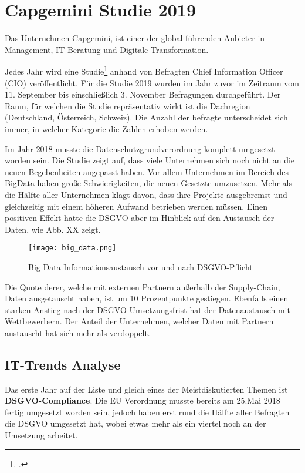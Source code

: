 \section{Capgemini Studie 2019}
Das Unternehmen Capgemini, ist einer der global führenden Anbieter in Management, IT-Beratung und Digitale Transformation.

Jedes Jahr wird eine Studie\footcite{Capgemini-Studie} anhand von Befragten Chief Information Officer (CIO) veröffentlicht. Für die Studie 2019 wurden im Jahr zuvor im Zeitraum vom 11. September bis einschließlich 3. November Befragungen durchgeführt. Der Raum, für welchen die Studie repräsentativ wirkt ist die Dachregion (Deutschland, Österreich, Schweiz). Die Anzahl der befragte unterscheidet sich immer, in welcher Kategorie die Zahlen erhoben werden.

Im Jahr 2018 musste die Datenschutzgrundverordnung komplett umgesetzt worden sein. Die Studie zeigt auf, dass viele Unternehmen sich noch nicht an die neuen Begebenheiten angepasst haben. Vor allem Unternehmen im Bereich des BigData haben große Schwierigkeiten, die neuen Gesetzte umzusetzen. Mehr als die Hälfte aller Unternehmen klagt davon, dass ihre Projekte ausgebremst und gleichzeitig mit einem höheren Aufwand betrieben werden müssen.
Einen positiven Effekt hatte die DSGVO aber im Hinblick auf den Austausch der Daten, wie Abb. XX zeigt.

\begin{center}
\begin{figure}[h]
    \centering
    \texttt{[image: big\_data.png]}
    \caption{Big Data Informationsaustausch vor und nach DSGVO-Pflicht}
\end{figure}
\end{center}

Die Quote derer, welche mit externen Partnern außerhalb der Supply-Chain, Daten ausgetauscht haben, ist um 10 Prozentpunkte gestiegen. Ebenfalls einen starken Anstieg nach der DSGVO Umsetzungsfrist hat der Datenaustausch mit Wettbewerbern. Der Anteil der Unternehmen, welcher Daten mit Partnern austauscht hat sich mehr als verdoppelt.

\subsection{IT-Trends Analyse}
Das erste Jahr auf der Liste und gleich eines der Meistdiskutierten Themen ist \textbf{DSGVO-Compliance}. Die EU Verordnung musste bereits am 25.Mai 2018 fertig umgesetzt worden sein, jedoch haben erst rund die Hälfte aller Befragten die DSGVO umgesetzt hat, wobei etwas mehr als ein viertel noch an der Umsetzung arbeitet.

